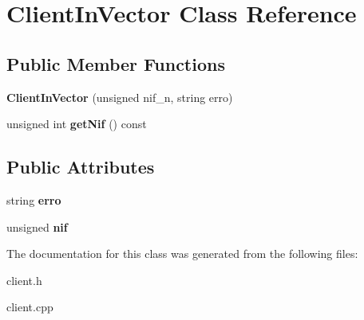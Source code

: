 \hypertarget{class_client_in_vector}{}\section{Client\+In\+Vector Class Reference}
\label{class_client_in_vector}
\subsection*{Public Member Functions}
\begin{DoxyCompactItemize}
\item 
\mbox{\label{class_client_in_vector_a10ec0356f39e99be9205d5c0f6897652}} 
{\bfseries Client\+In\+Vector} (unsigned nif\+\_\+n, string erro)
\item 
\mbox{\label{class_client_in_vector_adab501aba615f5d9b69bbe7a28053801}} 
unsigned int {\bfseries get\+Nif} () const
\end{DoxyCompactItemize}
\subsection*{Public Attributes}
\begin{DoxyCompactItemize}
\item 
\mbox{\label{class_client_in_vector_a65d04995fa02a6f36d00540120be34b5}} 
string {\bfseries erro}
\item 
\mbox{\label{class_client_in_vector_a8a7af8db098724eb214125a67c733955}} 
unsigned {\bfseries nif}
\end{DoxyCompactItemize}


The documentation for this class was generated from the following files\+:\begin{DoxyCompactItemize}
\item 
client.\+h\item 
client.\+cpp\end{DoxyCompactItemize}
